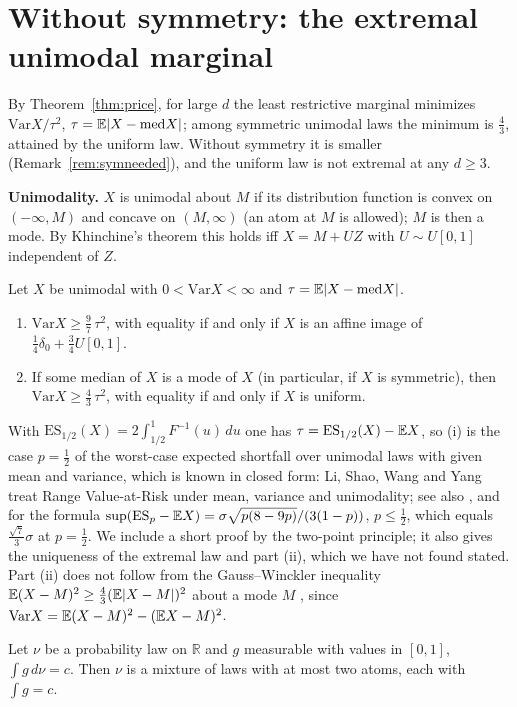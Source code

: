 \documentclass[11pt]{amsart}
\theoremstyle{definition}\newtheorem{definition}[theorem]{Definition}\theoremstyle{remark}\newtheorem{remark}[theorem]{Remark}
\begin{document}
\section{Without symmetry: the extremal unimodal marginal}\label{sec:unimodal}
By Theorem~\ref{thm:price}, for large $d$ the least restrictive marginal minimizes $\mathrm{Var}X/\tau^2$, $\tau=\mathbb E|X-\mathrm{med}X|$; among symmetric unimodal
laws the minimum is $\frac43$, attained by the uniform law. Without symmetry it is smaller (Remark~\ref{rem:symneeded}), and the uniform law is not extremal at any $d\ge3$.

\noindent\textbf{Unimodality.} $X$ is unimodal about $M$ if its distribution function is convex on $(-\infty,M)$ and concave on $(M,\infty)$ (an atom at $M$ is allowed);
$M$ is then a mode. By Khinchine's theorem \cite{Kh38,DJ88} this holds iff $X=M+UZ$ with $U\sim U[0,1]$ independent of $Z$.
\begin{proposition}\label{prop:97}
Let $X$ be unimodal with $0<\mathrm{Var}X<\infty$ and $\tau=\mathbb E|X-\mathrm{med}X|$.
\begin{enumerate}
\item[(i)] $\mathrm{Var}X\ge\frac97\,\tau^2$, with equality if and only if $X$ is an affine image of $\frac14\delta_0+\frac34U[0,1]$.
\item[(ii)] If some median of $X$ is a mode of $X$ (in particular, if $X$ is symmetric), then $\mathrm{Var}X\ge\frac43\,\tau^2$, with equality if and only if $X$ is uniform.
\end{enumerate}
\end{proposition}
\noindent With $\mathrm{ES}_{1/2}(X)=2\int_{1/2}^1F^{-1}(u)\,du$ one has $\tau=\mathrm{ES}_{1/2}(X)-\mathbb E X$, so (i) is the case $p=\frac12$ of the worst-case expected shortfall
over unimodal laws with given mean and variance, which is known in closed form: Li, Shao, Wang and Yang \cite{LSWY18} treat Range Value-at-Risk under mean, variance
and unimodality; see also \cite{BKV20,ZBYS26}, and \cite[Remark~8]{ZY25} for the formula $\sup(\mathrm{ES}_p-\mathbb E X)=\sigma\sqrt{p(8-9p)}/(3(1-p))$, $p\le\frac12$, which equals
$\frac{\sqrt7}3\sigma$ at $p=\frac12$. We include a short proof by the two-point principle; it also gives the uniqueness of the extremal law and part (ii), which we have not
found stated. Part (ii) does not follow from the Gauss--Winckler inequality $\mathbb E(X-M)^2\ge\frac43(\mathbb E|X-M|)^2$ about a mode $M$ \cite{Wi1866}, since
$\mathrm{Var}X=\mathbb E(X-M)^2-(\mathbb E X-M)^2$.
\begin{lemma}\label{lem:dec}
Let $\nu$ be a probability law on $\mathbb R$ and $g$ measurable with values in $[0,1]$, $\int g\,d\nu=c$. Then $\nu$ is a mixture of laws with at most two atoms, each with
$\int g=c$.
\end{lemma}
\end{document}
